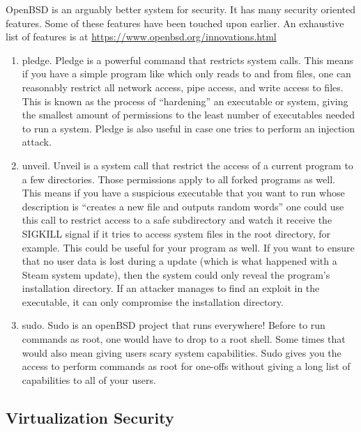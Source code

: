 OpenBSD is an arguably better system for security.
It has many security oriented features.
Some of these features have been touched upon earlier.
An exhaustive list of features is at \url{https://www.openbsd.org/innovations.html}

\begin{enumerate}
\item pledge.
  Pledge is a powerful command that restricts system calls.
  This means if you have a simple program like  which only reads to and from files, one can reasonably restrict all network access, pipe access, and write access to files.
  This is known as the process of ``hardening'' an executable or system, giving the smallest amount of permissions to the least number of executables needed to run a system.
  Pledge is also useful in case one tries to perform an injection attack.
\item unveil.
  Unveil is a system call that restrict the access of a current program to a few directories.
  Those permissions apply to all forked programs as well.
  This means if you have a suspicious executable that you want to run whose description is ``creates a new file and outputs random words'' one could use this call to restrict access to a safe subdirectory and watch it receive the SIGKILL signal if it tries to access system files in the root directory, for example.
  This could be useful for your program as well.
  If you want to ensure that no user data is lost during a update (which is what happened with a Steam system update), then the system could only reveal the program's installation directory.
  If an attacker manages to find an exploit in the executable, it can only compromise the installation directory.
\item sudo.
  Sudo is an openBSD project that runs everywhere!
  Before to run commands as root, one would have to drop to a root shell.
  Some times that would also mean giving users scary system capabilities.
  Sudo gives you the access to perform commands as root for one-offs without giving a long list of capabilities to all of your users.
\end{enumerate}

\subsection{Virtualization Security}

